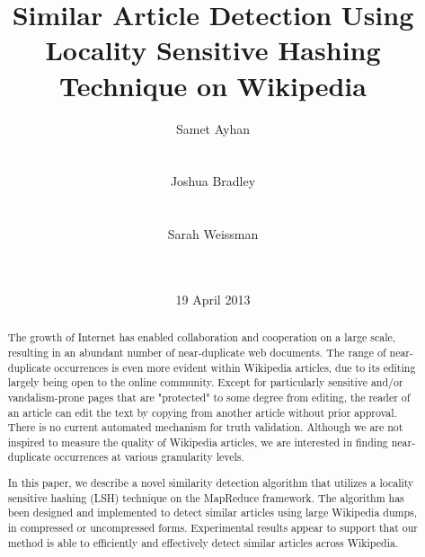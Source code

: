 \documentclass{acm_proc_article-sp}
\begin{document}
\title{Similar Article Detection Using Locality Sensitive Hashing Technique on Wikipedia}


\author{
\alignauthor Samet Ayhan\\
       \\
       \\
\alignauthor Joshua Bradley\\
       \\
       \\
\alignauthor Sarah Weissman\\
       \\
       \\
}

\date{19 April 2013}

\maketitle
\begin{abstract}
The growth of Internet has enabled collaboration and cooperation on a large scale, resulting in an abundant number of near-duplicate web documents. The range of near-duplicate occurrences is even more evident within Wikipedia articles, due to its editing largely being open to the online community. Except for particularly sensitive and/or vandalism-prone pages that are "protected" to some degree from editing, the reader of an article can edit the text by copying from another article without prior approval. There is no current automated mechanism for truth validation. Although we are not inspired to measure the quality of Wikipedia articles, we are interested in finding near-duplicate occurrences at various granularity levels. 

In this paper, we describe a novel similarity detection algorithm that utilizes a locality sensitive hashing (LSH) technique on the MapReduce framework. The algorithm has been designed and implemented to detect similar articles using large Wikipedia dumps, in compressed or uncompressed forms. Experimental results appear to support that our method is able to efficiently and effectively detect similar articles across Wikipedia.
\end{abstract}
\end{document}
